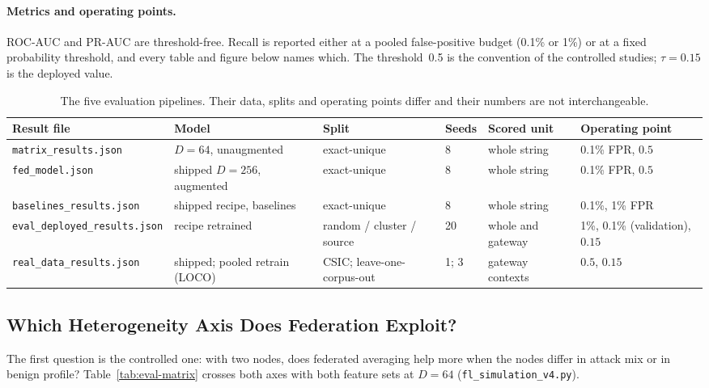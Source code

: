 \paragraph{Metrics and operating points.}
ROC-AUC and PR-AUC are threshold-free. Recall is reported either at a pooled false-positive budget (0.1\% or 1\%) or at a fixed probability threshold, and every table and figure below names which. The threshold~0.5 is the convention of the controlled studies; $\tau=0.15$ is the deployed value.

\begin{table}[t]
\centering
\caption{The five evaluation pipelines. Their data, splits and operating points differ and their numbers are not interchangeable.}
\label{tab:eval-pipelines}
\footnotesize
\setlength{\tabcolsep}{4pt}
\begin{tabular}{@{}p{4.0cm}p{3.0cm}p{3.0cm}p{0.9cm}p{2.2cm}p{2.8cm}@{}}
\toprule
\textbf{Result file} & \textbf{Model} & \textbf{Split} & \textbf{Seeds} & \textbf{Scored unit} & \textbf{Operating point} \\ \midrule
\texttt{matrix\_\allowbreak results.json} & $D{=}64$, unaugmented & exact-unique & 8 & whole string & 0.1\% FPR, $0.5$ \\
\texttt{fed\_model.json} & shipped $D{=}256$, augmented & exact-unique & 8 & whole string & 0.1\% FPR, $0.5$ \\
\texttt{baselines\_\allowbreak results.json} & shipped recipe, baselines & exact-unique & 8 & whole string & 0.1\%, 1\% FPR \\
\texttt{eval\_deployed\_\allowbreak results.json} & recipe retrained & random / cluster / source & 20 & whole and gateway & 1\%, 0.1\% (validation), $0.15$ \\
\texttt{real\_data\_\allowbreak results.json} & shipped; pooled retrain (LOCO) & CSIC; leave-one-corpus-out & 1; 3 & gateway contexts & $0.5$, $0.15$ \\ \bottomrule
\end{tabular}
\end{table}

\subsection{Which Heterogeneity Axis Does Federation Exploit?}
\label{sec:eval-matrix}

The first question is the controlled one: with two nodes, does federated averaging help more when the nodes differ in attack mix or in benign profile? Table~\ref{tab:eval-matrix} crosses both axes with both feature sets at $D=64$ (\texttt{fl\_simulation\_v4.py}).

